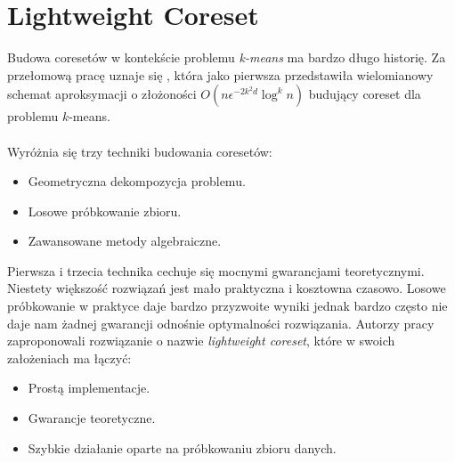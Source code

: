 \chapter{Lightweight Coreset}

Budowa coresetów w kontekście problemu \textit{k-means} ma bardzo długo historię.
Za przełomową pracę uznaje się \cite{Matousek99onapproximate}, która jako 
pierwsza przedstawiła wielomianowy schemat aproksymacji o złożoności $O(n\epsilon^{-2k^2d}\log^kn)$ budujący coreset dla problemu $k$-means.
\\~\\
Wyróżnia się trzy techniki budowania coresetów:
\begin{itemize}
    \item Geometryczna dekompozycja problemu.
    \item Losowe próbkowanie zbioru.
    \item Zawansowane metody algebraiczne.
\end{itemize}
Pierwsza i trzecia technika cechuje się mocnymi gwarancjami teoretycznymi.
Niestety większość rozwiązań jest mało praktyczna i kosztowna czasowo.
Losowe próbkowanie w praktyce daje bardzo przyzwoite wyniki jednak bardzo często nie daje nam żadnej gwarancji odnośnie optymalności rozwiązania.
Autorzy pracy \cite{bachem2017scalable} zaproponowali rozwiązanie o nazwie \textit{lightweight coreset}, które w swoich założeniach ma łączyć:
\begin{itemize}
    \item Prostą implementacje.
    \item Gwarancje teoretyczne.
    \item Szybkie działanie oparte na próbkowaniu zbioru danych.
\end{itemize}


